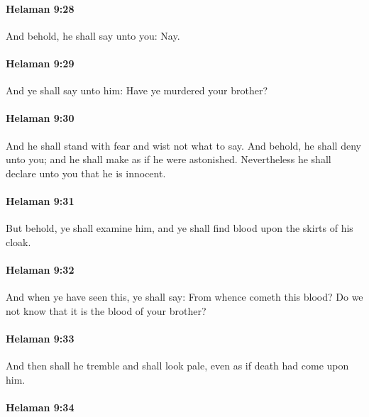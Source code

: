 		\paragraph{Helaman 9:28} %
			\label{HELAMAN-9-28}

			And behold, he shall say unto you: Nay.

		\paragraph{Helaman 9:29} %
			\label{HELAMAN-9-29}

			And ye shall say unto him:
			Have ye murdered your brother?

		\paragraph{Helaman 9:30} %
			\label{HELAMAN-9-30}

			And he shall stand with fear and wist not what to say.
			And behold, he shall deny unto you;
			and he shall make as if he were astonished.
			Nevertheless he shall declare unto you that he is innocent.

		\paragraph{Helaman 9:31} %
			\label{HELAMAN-9-31}

			But behold, ye shall examine him,
			and ye shall find blood upon the skirts of his cloak.

		\paragraph{Helaman 9:32} %
			\label{HELAMAN-9-32}

			And when ye have seen this, ye shall say:
			From whence cometh this blood?
			Do we not know that it is the blood of your brother?

		\paragraph{Helaman 9:33} %
			\label{HELAMAN-9-33}

			And then shall he tremble and shall look pale,
			even as if death had come upon him.

		\paragraph{Helaman 9:34} %
			\label{HELAMAN-9-34}

